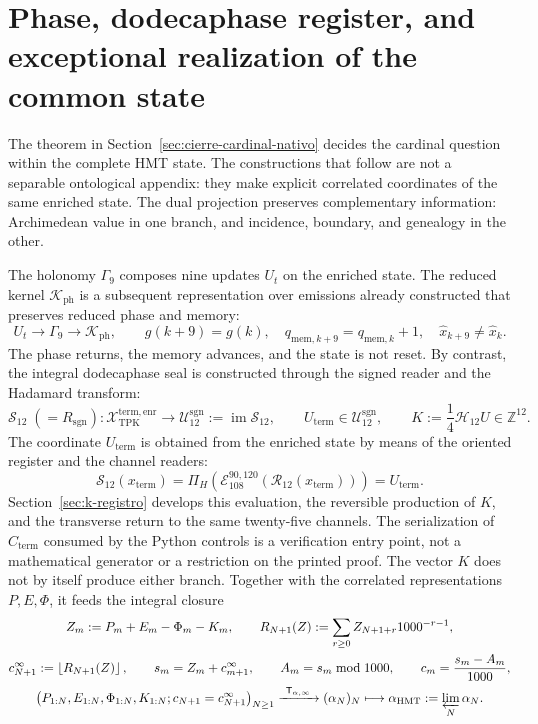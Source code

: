 \section{Phase, dodecaphase register, and exceptional realization of the common state}
\label{sec:testigos-descendentes-ch}

The theorem in Section~\ref{sec:cierre-cardinal-nativo} decides the cardinal
question within the complete HMT state. The constructions that follow are not
a separable ontological appendix: they make explicit correlated coordinates
of the same enriched state. The dual projection preserves complementary
information: Archimedean value in one branch, and incidence, boundary, and
genealogy in the other.

The holonomy \(\Gamma_9\) composes nine updates \(U_t\) on the enriched
state. The reduced kernel \(\mathcal K_{\mathrm{ph}}\) is a subsequent
representation over emissions already constructed that preserves reduced phase
and memory:
\[
 U_t\longrightarrow\Gamma_9\longrightarrow\mathcal K_{\mathrm{ph}},
 \qquad
 g(k+9)=g(k),\quad
 q_{\mathrm{mem},k+9}=q_{\mathrm{mem},k}+1,\quad
 \widehat x_{k+9}\neq\widehat x_k.
\]
The phase returns, the memory advances, and the state is not reset. By
contrast, the integral dodecaphase seal is constructed through the signed
reader and the Hadamard transform:
\[
 \mathcal S_{12}\;(=R_{\mathrm{sgn}}):
 \mathcal X_{\mathrm{TPK}}^{\mathrm{term,enr}}
 \longrightarrow
 \mathcal U_{12}^{\mathrm{sgn}}:=\operatorname{im}\mathcal S_{12},
 \qquad
 U_{\mathrm{term}}\in\mathcal U_{12}^{\mathrm{sgn}},
 \qquad
 K:=\frac14\mathcal H_{12}U\in\mathbb Z^{12}.
\]
The coordinate \(U_{\mathrm{term}}\) is obtained from the enriched state by
means of the oriented register and the channel readers:
\[
 \mathcal S_{12}(x_{\mathrm{term}})
 =\Pi_H\!\left(
   \mathcal E_{108}^{90,120}
   (\mathcal R_{12}(x_{\mathrm{term}}))\right)
 =U_{\mathrm{term}}.
\]
Section~\ref{sec:k-registro} develops this evaluation, the reversible
production of \(K\), and the transverse return to the same twenty-five
channels. The serialization of \(C_{\mathrm{term}}\) consumed by the Python
controls is a verification entry point, not a mathematical generator or a
restriction on the printed proof. The vector \(K\) does not by itself
produce either branch. Together with the correlated representations
\(P,E,\Phi\), it feeds the integral closure
\[
 \begin{gathered}
 Z_m:=P_m+E_m-\Phi_m-K_m,\qquad
 R_{N+1}(Z):=\sum_{r\geq0}Z_{N+1+r}1000^{-r-1},\\
 c_{N+1}^{\infty}:=\left\lfloor R_{N+1}(Z)\right\rfloor,\qquad
 s_m=Z_m+c_{m+1}^{\infty},\qquad
 A_m=s_m\bmod1000,\qquad
 c_m=\frac{s_m-A_m}{1000},\\
 \bigl(P_{1:N},E_{1:N},\Phi_{1:N},K_{1:N};
       c_{N+1}=c_{N+1}^{\infty}\bigr)_{N\geq1}
 \xrightarrow{\ \mathsf T_{\alpha,\infty}\ }
 (\alpha_N)_N
 \longmapsto
 \alpha_{\mathrm{HMT}}:=\varprojlim_N\alpha_N.
 \end{gathered}
\]
